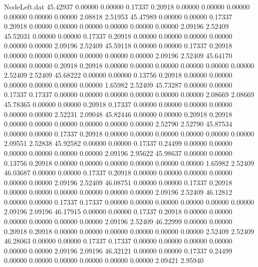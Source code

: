 \begin{filecontents}{NodeLeft.dat}
  45.42937    0.00000    0.00000     0.17337    0.20918    0.00000    0.00000    0.00000    0.00000    0.00000    0.00000    2.08818    2.51953
  45.47989    0.00000    0.00000     0.17337    0.20918    0.00000    0.00000    0.00000    0.00000    0.00000    0.00000    2.09196    2.52409
  45.52031    0.00000    0.00000     0.17337    0.20918    0.00000    0.00000    0.00000    0.00000    0.00000    0.00000    2.09196    2.52409
  45.59118    0.00000    0.00000     0.17337    0.20918    0.00000    0.00000    0.00000    0.00000    0.00000    0.00000    2.09196    2.52409
  45.64170    0.00000    0.00000     0.20918    0.20918    0.00000    0.00000    0.00000    0.00000    0.00000    0.00000    2.52409    2.52409
  45.68222    0.00000    0.00000     0.13756    0.20918    0.00000    0.00000    0.00000    0.00000    0.00000    0.00000    1.65982    2.52409
  45.73287    0.00000    0.00000     0.17337    0.17337    0.00000    0.00000    0.00000    0.00000    0.00000    0.00000    2.08669    2.08669
  45.78365    0.00000    0.00000     0.20918    0.17337    0.00000    0.00000    0.00000    0.00000    0.00000    0.00000    2.52231    2.09048
  45.82446    0.00000    0.00000     0.20918    0.20918    0.00000    0.00000    0.00000    0.00000    0.00000    0.00000    2.52790    2.52790
  45.87534    0.00000    0.00000     0.17337    0.20918    0.00000    0.00000    0.00000    0.00000    0.00000    0.00000    2.09551    2.52838
  45.92582    0.00000    0.00000     0.17337    0.24499    0.00000    0.00000    0.00000    0.00000    0.00000    0.00000    2.09196    2.95622
  45.98637    0.00000    0.00000     0.13756    0.20918    0.00000    0.00000    0.00000    0.00000    0.00000    0.00000    1.65982    2.52409
  46.03687    0.00000    0.00000     0.17337    0.20918    0.00000    0.00000    0.00000    0.00000    0.00000    0.00000    2.09196    2.52409
  46.08751    0.00000    0.00000     0.17337    0.20918    0.00000    0.00000    0.00000    0.00000    0.00000    0.00000    2.09196    2.52409
  46.12812    0.00000    0.00000     0.17337    0.17337    0.00000    0.00000    0.00000    0.00000    0.00000    0.00000    2.09196    2.09196
  46.17915    0.00000    0.00000     0.17337    0.20918    0.00000    0.00000    0.00000    0.00000    0.00000    0.00000    2.09196    2.52409
  46.22999    0.00000    0.00000     0.20918    0.20918    0.00000    0.00000    0.00000    0.00000    0.00000    0.00000    2.52409    2.52409
  46.28063    0.00000    0.00000     0.17337    0.17337    0.00000    0.00000    0.00000    0.00000    0.00000    0.00000    2.09196    2.09196
  46.32121    0.00000    0.00000     0.17337    0.24499    0.00000    0.00000    0.00000    0.00000    0.00000    0.00000    2.09421    2.95940

\end{filecontents}
